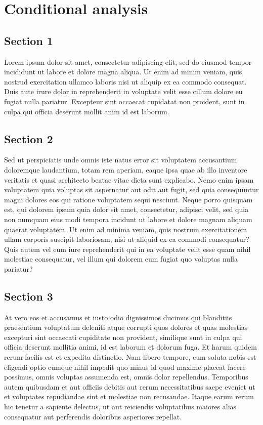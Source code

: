 \documentclass[
]{book}
\begin{document}
\hypertarget{conditional-analysis}{%
\chapter{Conditional analysis}\label{conditional-analysis}}

\hypertarget{section-1-3}{%
\section{Section 1}\label{section-1-3}}

Lorem ipsum dolor sit amet, consectetur adipiscing elit, sed do eiusmod tempor incididunt ut labore et dolore magna aliqua. Ut enim ad minim veniam, quis nostrud exercitation ullamco laboris nisi ut aliquip ex ea commodo consequat. Duis aute irure dolor in reprehenderit in voluptate velit esse cillum dolore eu fugiat nulla pariatur. Excepteur sint occaecat cupidatat non proident, sunt in culpa qui officia deserunt mollit anim id est laborum.

\hypertarget{section-2-3}{%
\section{Section 2}\label{section-2-3}}

Sed ut perspiciatis unde omnis iste natus error sit voluptatem accusantium doloremque laudantium, totam rem aperiam, eaque ipsa quae ab illo inventore veritatis et quasi architecto beatae vitae dicta sunt explicabo. Nemo enim ipsam voluptatem quia voluptas sit aspernatur aut odit aut fugit, sed quia consequuntur magni dolores eos qui ratione voluptatem sequi nesciunt. Neque porro quisquam est, qui dolorem ipsum quia dolor sit amet, consectetur, adipisci velit, sed quia non numquam eius modi tempora incidunt ut labore et dolore magnam aliquam quaerat voluptatem. Ut enim ad minima veniam, quis nostrum exercitationem ullam corporis suscipit laboriosam, nisi ut aliquid ex ea commodi consequatur? Quis autem vel eum iure reprehenderit qui in ea voluptate velit esse quam nihil molestiae consequatur, vel illum qui dolorem eum fugiat quo voluptas nulla pariatur?

\hypertarget{section-3-3}{%
\section{Section 3}\label{section-3-3}}

At vero eos et accusamus et iusto odio dignissimos ducimus qui blanditiis praesentium voluptatum deleniti atque corrupti quos dolores et quas molestias excepturi sint occaecati cupiditate non provident, similique sunt in culpa qui officia deserunt mollitia animi, id est laborum et dolorum fuga. Et harum quidem rerum facilis est et expedita distinctio. Nam libero tempore, cum soluta nobis est eligendi optio cumque nihil impedit quo minus id quod maxime placeat facere possimus, omnis voluptas assumenda est, omnis dolor repellendus. Temporibus autem quibusdam et aut officiis debitis aut rerum necessitatibus saepe eveniet ut et voluptates repudiandae sint et molestiae non recusandae. Itaque earum rerum hic tenetur a sapiente delectus, ut aut reiciendis voluptatibus maiores alias consequatur aut perferendis doloribus asperiores repellat.
\end{document}
